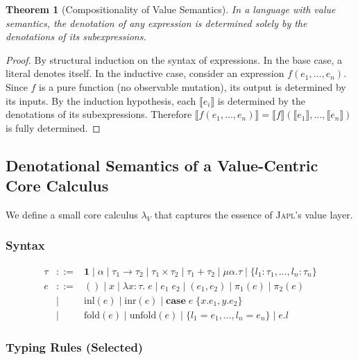 \documentclass[11pt]{article}
\newtheorem{theorem}{Theorem}[section]
\theoremstyle{definition}
\theoremstyle{remark}
\newcommand{\sem}[1]{\llbracket #1 \rrbracket}
\newcommand{\japl}{\textsc{Japl}}
\begin{document}
\begin{theorem}[Compositionality of Value Semantics]
\label{thm:compositionality}
In a language with value semantics, the denotation of any expression
is determined solely by the denotations of its subexpressions.
\end{theorem}

\begin{proof}
By structural induction on the syntax of expressions.  In the base
case, a literal denotes itself.  In the inductive case, consider an
expression $f(e_1, \ldots, e_n)$.  Since $f$ is a pure function
(no observable mutation), its output is determined by its inputs.
By the induction hypothesis, each $\sem{e_i}$ is determined by the
denotations of its subexpressions.  Therefore $\sem{f(e_1, \ldots,
e_n)} = \sem{f}(\sem{e_1}, \ldots, \sem{e_n})$ is fully determined.
\end{proof}

\subsection{Denotational Semantics of a Value-Centric Core Calculus}
\label{sec:formal:denotational}

We define a small core calculus $\lambda_V$ that captures the essence
of \japl{}'s value layer.

\subsubsection{Syntax}

\[
\begin{array}{rcl}
  \tau & ::= & \mathbf{1} \mid \alpha \mid \tau_1 \to \tau_2
    \mid \tau_1 \times \tau_2 \mid \tau_1 + \tau_2
    \mid \mu\alpha.\tau \mid \{l_1:\tau_1, \ldots, l_n:\tau_n\} \\[6pt]
  e & ::= & () \mid x \mid \lambda x:\tau.\; e \mid e_1\; e_2
    \mid (e_1, e_2) \mid \pi_1(e) \mid \pi_2(e) \\
    & \mid & \mathrm{inl}(e) \mid \mathrm{inr}(e) \mid
    \mathbf{case}\; e\; \{x.e_1, y.e_2\} \\
    & \mid & \mathrm{fold}(e) \mid \mathrm{unfold}(e) \mid
    \{l_1=e_1, \ldots, l_n=e_n\} \mid e.l
\end{array}
\]

\subsubsection{Typing Rules (Selected)}
\end{document}
